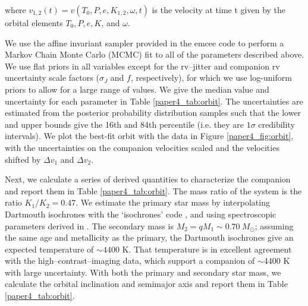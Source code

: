 where $v_{1,2}(t) = v(T_0, P, e, K_{1,2}, \omega, t)$ is the velocity at time t given by the orbital elements $T_0, P, e, K$, and $\omega$.

We use the affine invariant sampler provided in the emcee code \citep{emcee} to perform a Markov Chain Monte Carlo (MCMC) fit to all of the parameters described above. We use flat priors in all variables except for the rv--jitter and companion rv uncertainty scale factors ($\sigma_J$ and $f$, respectively), for which we use log-uniform priors to allow for a large range of values.  We give the median value and uncertainty for each parameter in Table \ref{paper4_tab:orbit}. The uncertainties are estimated from the posterior probability distribution samples such that the lower and upper bounds give the 16th and 84th percentile (i.e. they are $1\sigma$ credibility intervals). We plot the best-fit orbit with the data in Figure \ref{paper4_fig:orbit}, with the uncertainties on the companion velocities scaled and the velocities shifted by $\Delta v_1$ and $\Delta v_2$. 

Next, we calculate a series of derived quantities to characterize the companion and report them in Table \ref{paper4_tab:orbit}. The mass ratio of the system is the ratio $K_1/K_2 = 0.47$. We estimate the primary star mass by interpolating Dartmouth isochrones \citep{Dotter2008} with the `isochrones' code \citep[described in][]{Montet2015}, and using spectroscopic parameters derived in \citet{Endl2015}. The secondary mass is $M_2 = qM_1 \sim 0.70\ M_{\odot}$; assuming the same age and metallicity as the primary, the Dartmouth isochrones give an expected temperature of ${\sim}4400 $ K. That temperature is in excellent agreement with the high--contrast--imaging data, which support a companion of ${\sim}4400$ K with large uncertainty. With both the primary and secondary star mass, we calculate the orbital inclination and semimajor axis and report them in Table \ref{paper4_tab:orbit}.



